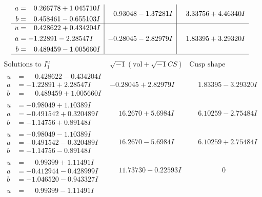 \documentclass[1p]{elsarticle_modified}
\theoremstyle{definition}
\newcommand{\I}{\sqrt{-1}}
\begin{document}
$$\begin{array}{c|c|c}
\begin{aligned}
a &= \phantom{-}0.266778 + 1.045710 I \\
b &= \phantom{-}0.458461 - 0.655103 I\end{aligned}
 & \phantom{-}0.93048 - 1.37281 I & \phantom{-}3.33756 + 4.46340 I \\ \hline\begin{aligned}
u &= \phantom{-}0.428622 + 0.434204 I \\
a &= -1.22891 - 2.28547 I \\
b &= \phantom{-}0.489459 - 1.005660 I\end{aligned}
 & -0.28045 - 2.82979 I & \phantom{-}1.83395 + 3.29320 I\\
 \hline 
 \end{array}$$\newpage$$\begin{array}{c|c|c}  
\text{Solutions to }I^u_{1}& \I (\text{vol} + \sqrt{-1}CS) & \text{Cusp shape}\\
 \hline 
\begin{aligned}
u &= \phantom{-}0.428622 - 0.434204 I \\
a &= -1.22891 + 2.28547 I \\
b &= \phantom{-}0.489459 + 1.005660 I\end{aligned}
 & -0.28045 + 2.82979 I & \phantom{-}1.83395 - 3.29320 I \\ \hline\begin{aligned}
u &= -0.98049 + 1.10389 I \\
a &= -0.491542 + 0.320489 I \\
b &= -1.14756 + 0.89148 I\end{aligned}
 & \phantom{-}16.2670 + 5.6984 I & \phantom{-}6.10259 - 2.75484 I \\ \hline\begin{aligned}
u &= -0.98049 - 1.10389 I \\
a &= -0.491542 - 0.320489 I \\
b &= -1.14756 - 0.89148 I\end{aligned}
 & \phantom{-}16.2670 - 5.6984 I & \phantom{-}6.10259 + 2.75484 I \\ \hline\begin{aligned}
u &= \phantom{-}0.99399 + 1.11491 I \\
a &= -0.412944 - 0.428999 I \\
b &= -1.046520 - 0.943327 I\end{aligned}
 & \phantom{-}11.73730 - 0.22593 I & \phantom{-0.000000 } 0 \\ \hline\begin{aligned}
u &= \phantom{-}0.99399 - 1.11491 I \\

\end{aligned}
\end{array}$$
\end{document}

